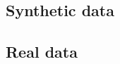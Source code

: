 \documentclass[10pt]{beamer}
\newcommand{\indep}{\perp \!\!\! \perp}
\begin{document}
\subsection{Synthetic data}%
\label{sub:synthetic_data}

\subsection{Real data}%
\label{sub:real_data}


\begin{frame}
    \frametitle{}
\end{frame}






%
\end{document}
